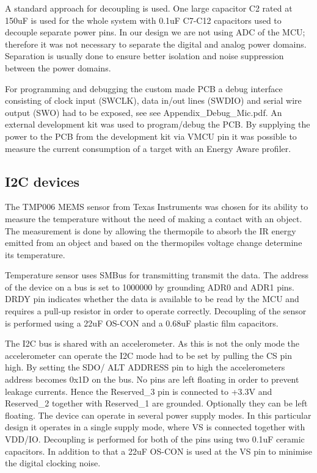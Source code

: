 A standard approach for decoupling is used. One large capacitor C2 rated at 150uF is used for the whole system with 0.1uF C7-C12 capacitors used to decouple separate power pins. In our design we are not using ADC of the MCU; therefore it was not necessary to separate the digital and analog power domains. Separation is usually done to ensure better isolation and noise suppression between the power domains.


For programming and debugging the custom made PCB a debug interface consisting of clock input (SWCLK), data in/out lines (SWDIO) and serial wire output (SWO) had to be exposed, see \TODO{}see Appendix\_Debug\_Mic.pdf. An external development kit was used to program/debug the PCB. By supplying the power to the PCB from the development kit via VMCU pin it was possible to measure the current consumption of a target with an Energy Aware profiler.


\subsection{I2C devices}
The TMP006 MEMS sensor from Texas Instruments was chosen for its ability to measure the temperature without the need of making a contact with an object. The measurement is done by allowing the thermopile to absorb the IR energy emitted from an object and based on the thermopiles voltage change determine its temperature.

Temperature sensor uses SMBus for transmitting transmit the data. The address of the device on a bus is set to 1000000 by grounding ADR0 and ADR1 pins. DRDY pin indicates whether the data is available to be read by the MCU and requires a pull-up resistor in order to operate correctly. Decoupling of the sensor is performed using a 22uF OS-CON and a 0.68uF plastic film capacitors.

The I2C bus is shared with an accelerometer. As this is not the only mode the accelerometer can operate the I2C mode had to be set by pulling the CS pin high. By setting the SDO/ ALT ADDRESS pin to high the accelerometers address becomes 0x1D on the bus. No pins are left floating in order to prevent leakage currents. Hence the Reserved\_3 pin is connected to +3.3V and Reserved\_2 together with Reserved\_1 are grounded. Optionally they can be left floating. 
The device can operate in several power supply modes. In this particular design it operates in a single supply mode, where VS is connected together with VDD/IO. Decoupling is performed for both of the pins using two 0.1uF ceramic capacitors. In addition to that a 22uF OS-CON is used at the VS pin to minimise the digital clocking noise.


